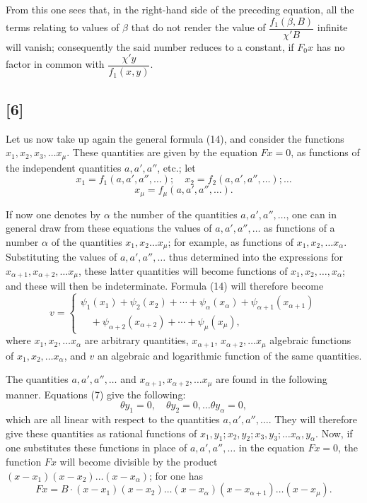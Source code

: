 \documentclass{article}
\begin{document}
From this one sees that, in the right-hand side of the preceding equation, all the terms relating to values of $\beta$ that do not render the value of $\dfrac{f_1(\beta,B)}{\chi' B}$ infinite will vanish; consequently the said number reduces to a constant, if $F_0 x$ has no factor in common with $\dfrac{\chi' y}{f_1(x,y)}$.

\subsection*{[6]}

Let us now take up again the general formula (14), and consider the functions $x_1, x_2, x_3, \ldots x_\mu$. These quantities are given by the equation $F x = 0$, as functions of the independent quantities $a, a', a''$, etc.; let
\[ x_1 = f_1(a, a', a'', \ldots); \quad x_2 = f_2(a, a', a'', \ldots); \ldots \]
\[ x_\mu = f_\mu(a, a', a'', \ldots). \]

If now one denotes by $\alpha$ the number of the quantities $a, a', a'', \ldots$, one can in general draw from these equations the values of $a, a', a'', \ldots$ as functions of a number $\alpha$ of the quantities $x_1, x_2 \ldots x_\mu$; for example, as functions of $x_1, x_2, \ldots x_\alpha$. Substituting the values of $a, a', a'', \ldots$ thus determined into the expressions for $x_{\alpha+1}, x_{\alpha+2}, \ldots x_\mu$, these latter quantities will become functions of $x_1, x_2, \ldots, x_\alpha$; and these will then be indeterminate. Formula (14) will therefore become
\[ v = \begin{cases} \psi_1(x_1) + \psi_2(x_2) + \cdots + \psi_\alpha(x_\alpha) + \psi_{\alpha+1}(x_{\alpha+1}) \\ \quad + \psi_{\alpha+2}(x_{\alpha+2}) + \cdots + \psi_\mu(x_\mu), \end{cases} \tag{70} \]
where $x_1, x_2, \ldots x_\alpha$ are arbitrary quantities, $x_{\alpha+1}$,
$x_{\alpha+2}, \ldots x_\mu$ algebraic functions of $x_1, x_2, \ldots x_\alpha$, and $v$ an algebraic and logarithmic function of the same quantities.

The quantities $a, a', a'', \ldots$ and $x_{\alpha+1}, x_{\alpha+2}, \ldots x_\mu$ are found in the following manner. Equations (7) give the following:
\[ \theta y_1 = 0, \quad \theta y_2 = 0, \ldots \theta y_\alpha = 0, \tag{71} \]
which are all linear with respect to the quantities $a, a', a'', \ldots$. They will therefore give these quantities as rational functions of $x_1, y_1; x_2, y_2; x_3, y_3; \ldots x_\alpha, y_\alpha$. Now, if one substitutes these functions in place of $a, a', a'', \ldots$ in the equation $F x = 0$, the function $F x$ will become divisible by the product $(x-x_1)(x-x_2) \ldots (x-x_\alpha)$; for one has
\[ F x = B \cdot (x-x_1)(x-x_2) \ldots (x-x_\alpha)(x-x_{\alpha+1}) \ldots (x-x_\mu). \]
\end{document}
